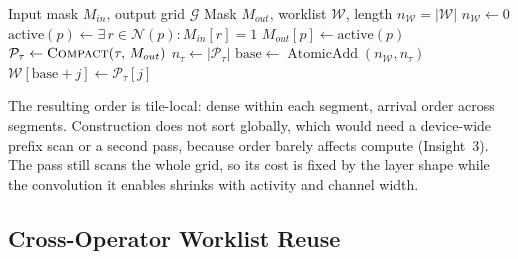 \begin{algorithm}[t]
\caption{Tile-Local Worklist Construction}
\label{alg:construct}
\begin{algorithmic}[1]
\REQUIRE Input mask $M_{in}$, output grid $\mathcal{G}$
\ENSURE Mask $M_{out}$, worklist $\mathcal{W}$, length
        $n_{\mathcal{W}}=|\mathcal{W}|$
\STATE $n_{\mathcal{W}} \leftarrow 0$
    \STATE $\mathrm{active}(p) \leftarrow \exists\, r \in \mathcal{N}(p): M_{in}[r] = 1$
    \STATE $M_{out}[p] \leftarrow \mathrm{active}(p)$
  \ENDFOR
  \STATE $\mathcal{P}_\tau \leftarrow \textsc{Compact}(\tau,\,M_{out})$
  \STATE $n_\tau \leftarrow |\mathcal{P}_\tau|$
  \STATE $\mathrm{base} \leftarrow
         \operatorname{AtomicAdd}(n_{\mathcal{W}},n_\tau)$
    \STATE $\mathcal{W}[\mathrm{base}+j] \leftarrow \mathcal{P}_\tau[j]$
  \ENDFOR
\ENDFOR
\end{algorithmic}
\end{algorithm}

The resulting order is tile-local: dense within each segment, arrival order
across segments. Construction does not sort globally, which would need a
device-wide prefix scan or a second pass, because order barely affects compute (Insight~3). The pass still scans the whole grid, so its cost is
fixed by the layer shape while the convolution it enables shrinks with activity
and channel width.

\subsection{Cross-Operator Worklist Reuse}
\label{sec:design:reuse}

